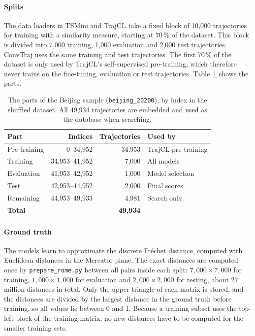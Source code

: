 \paragraph{Splits}
The data loaders in TSMini and TrajCL take a fixed block of 10{,}000 trajectories
for training with a similarity measure, starting at 70\,\% of the dataset. This
block is divided into 7{,}000 training, 1{,}000 evaluation and 2{,}000 test
trajectories. ConvTraj uses the same training and test trajectories. The first
70\,\% of the dataset is only used by TrajCL's self-supervised pre-training, which
therefore never trains on the fine-tuning, evaluation or test trajectories.
Table~\ref{tab:beijing-splits} shows the parts.

\begin{table}[htbp]
  \centering
  \begin{tabular}{|l|r|r|l|}
    \hline
    \textbf{Part} & \textbf{Indices} & \textbf{Trajectories} & \textbf{Used by} \\
    \hline
    Pre-training     & 0--34{,}952        & 34{,}953 & TrajCL pre-training \\
    Training         & 34{,}953--41{,}952 & 7{,}000  & All models \\
    Evaluation       & 41{,}953--42{,}952 & 1{,}000  & Model selection \\
    Test             & 42{,}953--44{,}952 & 2{,}000  & Final scores \\
    Remaining        & 44{,}953--49{,}933 & 4{,}981  & Search only \\
    \hline
    \textbf{Total}   &                    & \textbf{49{,}934} & \\
    \hline
  \end{tabular}
  \caption{The parts of the Beijing sample (\texttt{beijing\_20200}), by index in
  the shuffled dataset. All 49{,}934 trajectories are embedded and used as the
  database when searching.}
  \label{tab:beijing-splits}
\end{table}

\paragraph{Ground truth}
The models learn to approximate the discrete Fréchet distance, computed with
Euclidean distances in the Mercator plane. The exact distances are computed once by
\texttt{prepare\_rome.py} between all pairs inside each split: $7{,}000 \times
7{,}000$ for training, $1{,}000 \times 1{,}000$ for evaluation and $2{,}000 \times
2{,}000$ for testing, about 27 million distances in total. Only the upper triangle
of each matrix is stored, and the distances are divided by the largest distance in
the ground truth before training, so all values lie between 0 and 1. Because a
training subset uses the top-left block of the training matrix, no new distances
have to be computed for the smaller training sets.

